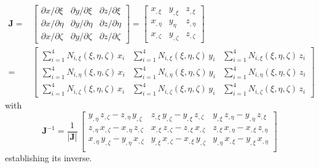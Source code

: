 \begin{equation}
\begin{aligned}
\mathbf{J}= &
\begin{bmatrix}
\partial x / \partial\xi & \partial y / \partial\xi & \partial z / \partial\xi\\
\partial x / \partial\eta & \partial y / \partial\eta & \partial z / \partial\eta \\
\partial x / \partial\zeta & \partial y / \partial\zeta & \partial z / \partial\zeta 
\end{bmatrix} = \begin{bmatrix} 
x_{,\xi} & y_{,\xi} & z_{,\xi} \\
x_{,\eta} & y_{\eta} & z_{,\eta} \\
x_{,\zeta} & y_{,\zeta} & z_{,\zeta}
\end{bmatrix} \\
= & \begin{bmatrix}
\sum\nolimits_{i=1}^4 N_{i,\xi} (\xi,\eta,\zeta) \, x_i & \sum\nolimits_{i=1}^4 N_{i,\xi} (\xi,\eta,\zeta) \, y_i &
\sum\nolimits_{i=1}^4 N_{i,\xi} (\xi,\eta,\zeta) \, z_i\\
\sum\nolimits_{i=1}^4 N_{i,\eta} (\xi,\eta,\zeta) \, x_i & \sum\nolimits_{i=1}^4 N_{i,\eta} (\xi,\eta,\zeta) \, y_i &
\sum\nolimits_{i=1}^4 N_{i,\eta} (\xi,\eta,\zeta) \, z_i\\
\sum\nolimits_{i=1}^4 N_{i,\zeta} (\xi,\eta,\zeta) \, x_i & \sum\nolimits_{i=1}^4 N_{i,\zeta} (\xi,\eta,\zeta) \, y_i &
\sum\nolimits_{i=1}^4 N_{i,\zeta} (\xi,\eta,\zeta) \, z_i
\end{bmatrix} 
\end{aligned}
\label{jacobiantet}
\end{equation}
with
\begin{equation}
\mathbf{J}^{-1} = \frac{1}{|\mathbf{J}|} \,
\begin{bmatrix}
y_{,\eta} \, z_{,\zeta} - z_{,\eta} \, y_{,\zeta}  & z_{,\xi} \, y_{,\zeta} - y_{,\xi} \, z_{,\zeta} & y_{,\xi} \, z_{,\eta} - y_{,\eta} \, z_{,\xi} \\
z_{,\eta} \, x_{,\zeta} - x_{,\eta} \, z_{,\zeta}  &  x_{,\xi} \, z_{,\zeta} - z_{,\xi} \, x_{,\zeta} & z_{,\xi} \, x_{,\eta} - x_{,\xi} \, z_{,\eta} \\
x_{,\eta} \, y_{,\zeta} - y_{,\eta} \, x_{,\zeta}  & y_{,\xi} \, x_{,\zeta} - x_{,\xi} \, y_{,\zeta} & y_{,\eta} \, x_{,\xi} - y_{,\xi} \, x_{,\eta} \\
\end{bmatrix} 
\label{detjacobiantet}
\end{equation}
establishing its inverse.

